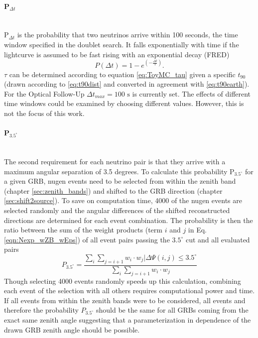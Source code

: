 \paragraph{P$_{\Delta t}$}$\;$\\
P$_{\Delta t}$ is the probability that two neutrinos arrive within
100 seconds, the time window
specified in the doublet search. 
It falls exponentially with time if the lightcurve is assumed to be fast rising
with an exponential decay (FRED)
\begin{equation}
 P(\Delta t) = 1 - e^{\left(-\frac{\Delta t}{\tau} \right)}.
\end{equation}
$\tau$ can be determined according to equation \ref{eq:ToyMC_tau} given
a specific $t_{90}$ (drawn according to \ref{eq:t90dist} and converted in 
agreement
with \ref{eq:t90earth}). For the Optical Follow-Up
$\Delta t_{max} =100 \text{ s}$ is currently set. 
The effects of different time
windows could be examined by choosing different values. However, this is not
the focus of this work.



\paragraph{P$_{3.5^\circ}$}$\;$\\
The second requirement for each neutrino pair is that they arrive with a
maximum angular separation of 3.5 degrees. To calculate this probability 
P$_{3.5^\circ}$ for a given GRB, nugen events need to be
selected from within the zenith band (chapter \ref{sec:zenith_bands}) and
shifted to the GRB direction (chapter \ref{sec:shift2source}). 
To save on computation time, 4000 of the nugen events are selected randomly
and the angular 
differences of the
shifted reconstructed directions are determined for each event combination. The 
probability is then the
ratio between the sum of the weight products (term $i$ and $j$ in Eq. 
\ref{eqn:Nexp_wZB_wEps}) of
all event pairs passing the $3.5^\circ$ cut and all evaluated pairs
\begin{equation}
\label{eq:P3p5}
 P_{3.5^\circ} = \frac{\sum_{i} \sum_{j=i+1} w_i \cdot w_j | \Delta \Psi(i, j)
\leq
3.5^{\circ}}{\sum_i \sum_{j=i+1} w_i \cdot w_j}
\end{equation}
Though selecting 4000 events randomly speeds up this calculation, combining 
each event of the selection with all others requires computational power 
and time. 
If all events from within the zenith bands were to be considered, all events 
and therefore the probability $P_{3.5^\circ}$ should be the same for all GRBs 
coming from the exact same zenith angle suggesting that a parameterization in 
dependence of the drawn GRB zenith angle should be possible. 

